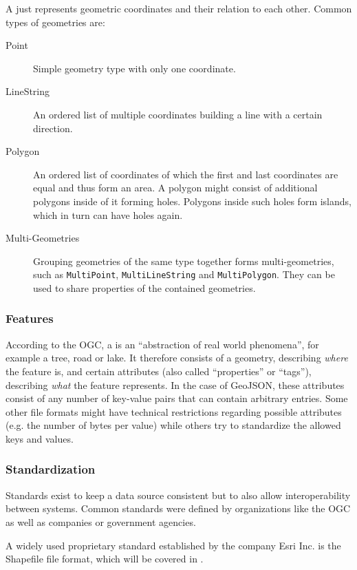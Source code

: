 			A  just represents geometric coordinates and their relation to each other.
			Common types of geometries are:
			\begin{description}
				\item[Point] Simple geometry type with only one coordinate.
				\item[LineString] An ordered list of multiple coordinates building a line with a certain direction.
				\item[Polygon] An ordered list of coordinates of which the first and last coordinates are equal and thus form an area. A polygon might consist of additional polygons inside of it forming holes. Polygons inside such holes form islands, which in turn can have holes again.
				\item[Multi-Geometries] Grouping geometries of the same type together forms multi-geometries, such as \texttt{MultiPoint}, \texttt{MultiLineString} and \texttt{MultiPolygon}. They can be used to share properties of the contained geometries.
			\end{description}
		
		\subsubsection{Features}
		
			According to the OGC, a  is an \enquote{abstraction of real world phenomena}\cite{ogc-sfa}, for example a tree, road or lake.
			It therefore consists of a geometry, describing \textit{where} the feature is, and certain attributes (also called \enquote{properties} or \enquote{tags}), describing \textit{what} the feature represents.
			In the case of GeoJSON, these attributes consist of any number of key-value pairs that can contain arbitrary entries.
			Some other file formats might have technical restrictions regarding possible attributes (e.g. the number of bytes per value) while others try to standardize the allowed keys and values.
		
		\subsubsection{Standardization}
		
			Standards exist to keep a data source consistent but to also allow interoperability between systems.
			Common standards were defined by organizations like the OGC as well as companies or government agencies.
			
			A widely used proprietary standard established by the company Esri Inc. is the Shapefile file format, which will be covered in .
			
